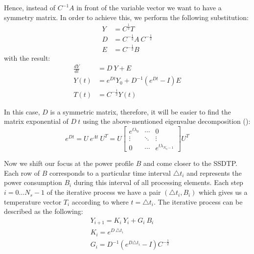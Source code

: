 Hence, instead of $C^{-1} A$ in front of the variable vector we want to have a symmetry matrix. In order to achieve this, we perform the following substitution:
\begin{align*}
  Y & = C^{\frac{1}{2}} T \\
  D & = C^{-\frac{1}{2}} A \: C^{-\frac{1}{2}} \\
  E & = C^{-\frac{1}{2}} B
\end{align*}
with the result:
\begin{align}
  \frac{dY}{dt} & = D \: Y + E \nonumber \\
  Y(t) & = e^{D t} Y_0 + D^{-1} (e^{D t} - I) E \label{eq:modified-solution} \\
  T(t) & = C^{-\frac{1}{2}} Y(t) \label{eq:finalization}
\end{align}

In this case, $D$ is a symmetric matrix, therefore, it will be easier to find the matrix exponential of $D \: t$ using the above-mentioned eigenvalue decomposition ():
\[
  e^{D t} = U \: e^{\Lambda t} \: U^T = U \left[
      \begin{array}{ccc}
        e^{t \lambda_0} & \cdots & 0 \\
        \vdots & \ddots & \vdots \\
        0 & \cdots & e^{t \lambda_{N_n - 1}}
      \end{array}
    \right] U^T
\]

Now we shift our focus at the power profile $B$ and come closer to the SSDTP. Each row of $B$ corresponds to a particular time interval $\triangle t_i$ and represents the power consumption $B_i$ during this interval of all processing elements. Each step $i = 0 \dots N_s - 1$ of the iterative process we have a pair $(\triangle t_i, B_i)$ which gives us a temperature vector $T_i$ according to  where $t = \triangle t_i$. The iterative process can be described as the following:
\begin{align}
  & Y_{i+1} = K_i \: Y_i + G_i \: B_i \label{eq:recurrent-equation} \\
  & K_i = e^{D \: \triangle t_i} \nonumber \\
  & G_i = D^{-1} \left( e^{D \triangle t_i} - I \right) C^{-\frac{1}{2}} \nonumber
\end{align}

